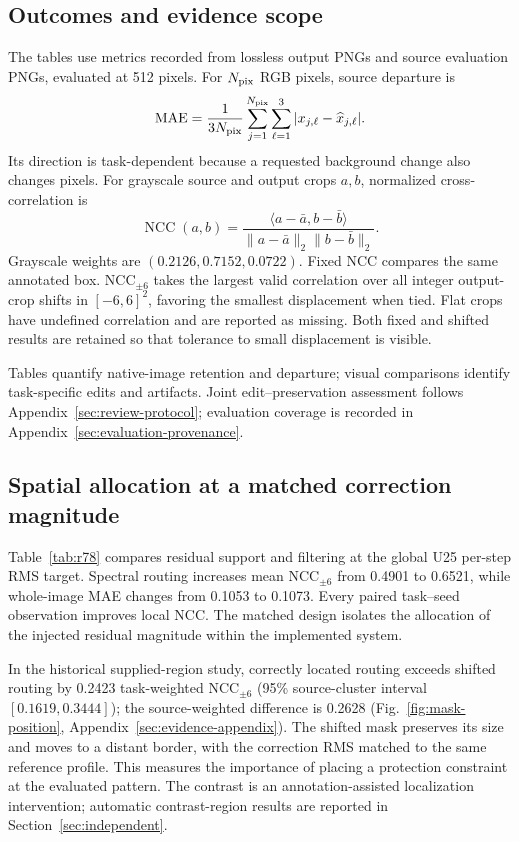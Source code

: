 \documentclass[conference]{IEEEtran}
\begin{document}
\subsection{Outcomes and evidence scope}
The tables use metrics recorded from lossless output PNGs and source evaluation PNGs, evaluated at 512 pixels. For $N_{\rm pix}$ RGB pixels, source departure is
\begin{equation}
\operatorname{MAE}=\frac{1}{3N_{\rm pix}}\sum_{j=1}^{N_{\rm pix}}\sum_{\ell=1}^{3}|x_{j,\ell}-\widehat x_{j,\ell}|.
\end{equation}
Its direction is task-dependent because a requested background change also changes pixels. For grayscale source and output crops $a,b$, normalized cross-correlation is
\begin{equation}
\operatorname{NCC}(a,b)=\frac{\langle a-\bar a,b-\bar b\rangle}{\|a-\bar a\|_2\|b-\bar b\|_2}.
\end{equation}
Grayscale weights are $(0.2126,0.7152,0.0722)$. Fixed NCC compares the same annotated box. NCC$_{\pm6}$ takes the largest valid correlation over all integer output-crop shifts in $[-6,6]^2$, favoring the smallest displacement when tied. Flat crops have undefined correlation and are reported as missing. Both fixed and shifted results are retained so that tolerance to small displacement is visible.

Tables quantify native-image retention and departure; visual comparisons identify task-specific edits and artifacts. Joint edit--preservation assessment follows Appendix~\ref{sec:review-protocol}; evaluation coverage is recorded in Appendix~\ref{sec:evaluation-provenance}.

\subsection{Spatial allocation at a matched correction magnitude}
Table~\ref{tab:r78} compares residual support and filtering at the global U25 per-step RMS target. Spectral routing increases mean NCC$_{\pm6}$ from 0.4901 to 0.6521, while whole-image MAE changes from 0.1053 to 0.1073. Every paired task--seed observation improves local NCC. The matched design isolates the allocation of the injected residual magnitude within the implemented system.

In the historical supplied-region study, correctly located routing exceeds shifted routing by 0.2423 task-weighted NCC$_{\pm6}$ (95\% source-cluster interval $[0.1619,0.3444]$); the source-weighted difference is 0.2628 (Fig.~\ref{fig:mask-position}, Appendix~\ref{sec:evidence-appendix}). The shifted mask preserves its size and moves to a distant border, with the correction RMS matched to the same reference profile. This measures the importance of placing a protection constraint at the evaluated pattern. The contrast is an annotation-assisted localization intervention; automatic contrast-region results are reported in Section~\ref{sec:independent}.
\end{document}
